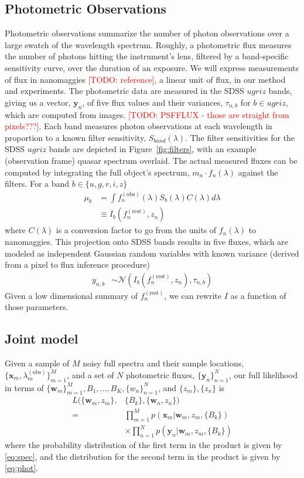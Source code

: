 \documentclass{article}
\newcommand{\red}[1]{\textcolor{red}{[TODO: #1]}}
\begin{document}
\subsection{Photometric Observations}
Photometric observations summarize the number of photon observations over a large swatch of the wavelength spectrum.  Roughly, a photometric flux measures the number of photons hitting the instrument's lens, filtered by a band-specific sensitivity curve, over the duration of an exposure. 
We will express measurements of flux in nanomaggies \red{reference}, a linear unit of flux, in our method and experiments.  
The photometric data are measured in the SDSS $ugriz$ bands, giving us a vector, $\mathbf{y}_n$, of five flux values and their variances, $\tau_{n, b}$ for $b \in ugriz$, which are computed from images. \red{PSFFLUX - those are straight from pixels???}.  
Each band measures photon observations at each wavelength in proportion to a known filter sensitivity, $S_{band}(\lambda)$. 
The filter sensitivities for the SDSS $ugriz$ bands are depicted in Figure~\ref{fig:filters}, with an example (observation frame) quasar spectrum overlaid.   The actual measured fluxes can be computed by integrating the full object's spectrum, $m_n \cdot f_n(\lambda)$ against the filters.  For a band $b \in \{u, g, r, i, z \}$
\begin{align}
  \mu_b &= \int f^{(\text{obs})}_n(\lambda) S_b(\lambda) C(\lambda) d \lambda  \\
        &\equiv I_b(f_n^{(\text{rest})}, z_n)
\end{align}
where $C(\lambda)$ is a conversion factor to go from the units of $f_n(\lambda)$ to nanomaggies.  This projection onto SDSS bands results in five fluxes, which are modeled as independent Gaussian random variables with known variance (derived from a pixel to flux inference procedure)
\begin{align}
  y_{n,b} &\sim \mathcal{N}( I_b(f_n^{(\text{rest})}, z_n), \tau_{n,b} )
  \label{eq:phot}
\end{align}
Given a low dimensional summary of $f_n^{(\text{rest})}$, we can rewrite $I$ as a function of those parameters. 

\subsection{Joint model}
Given a sample of $M$ noisy full spectra and their sample locations, $\{\mathbf{x}_m, \lambda^{(\text{obs})}_m \}_{m=1}^M$, and a set of $N$ photometric fluxes, $\{\mathbf{y}_n\}_{n=1}^N$, our full likelihood in terms of $\{ \mathbf{w}_m \}_{m=1}^M, B_1, \dots, B_K, \{ w_n \}_{n=1}^N$, and $\{z_m\}, \{z_n\}$ is 
\begin{align*}
  L( \{ \mathbf{w}_m, z_m \}, &\{ B_k \}, \{ \mathbf{w}_n, z_n \} )  \\
    = & \prod_{m=1}^M p( \mathbf{x}_m | \mathbf{w}_m, z_m, \{ B_k \})  \\
      & \times \prod_{n=1}^N p( \mathbf{y}_n | \mathbf{w}_m, z_m, \{ B_k \})
\end{align*}
where the probability distribution of the first term in the product is given by \ref{eq:spec}, and the distribution for the second term in the product is given by \ref{eq:phot}.  
\end{document}
